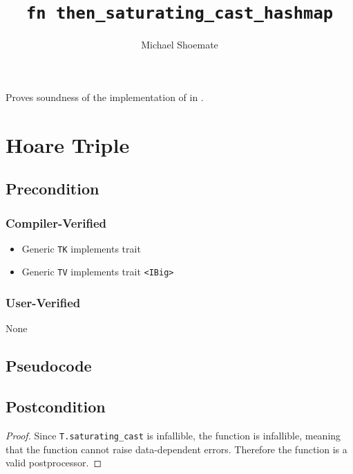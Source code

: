 \documentclass{article}
\title{\texttt{fn then\_saturating\_cast\_hashmap}}
\author{Michael Shoemate}
\date{}
\begin{document}
\maketitle

\contrib
Proves soundness of the implementation of  in .

\section{Hoare Triple}
\subsection*{Precondition}
\subsubsection*{Compiler-Verified}

\begin{itemize}
    \item Generic \texttt{TK} implements trait 
    \item Generic \texttt{TV} implements trait \texttt{<IBig>}
\end{itemize}

\subsubsection*{User-Verified}
None

\subsection*{Pseudocode}


\subsection*{Postcondition}
\begin{theorem}
\end{theorem}

\begin{proof}
    Since \texttt{T.saturating\_cast} is infallible, the function is infallible,
    meaning that the function cannot raise data-dependent errors.
    Therefore the function is a valid postprocessor.
\end{proof}
\end{document}
